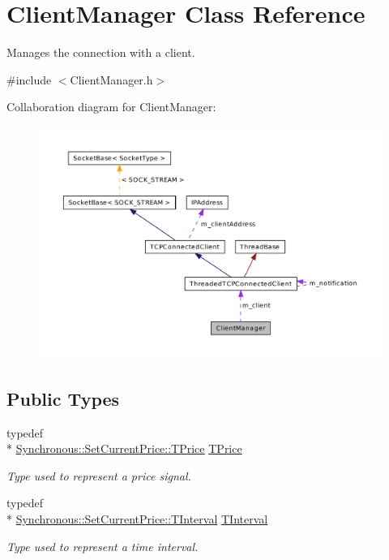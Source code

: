 \hypertarget{class_client_manager}{\section{Client\-Manager Class Reference}
\label{class_client_manager}
}


Manages the connection with a client.  




{\ttfamily \#include $<$Client\-Manager.\-h$>$}



Collaboration diagram for Client\-Manager\-:\nopagebreak
\begin{figure}[H]
\begin{center}
\leavevmode
\includegraphics[width=350pt]{class_client_manager__coll__graph}
\end{center}
\end{figure}
\subsection*{Public Types}
\begin{DoxyCompactItemize}
\item 
typedef \\*
\hyperlink{class_terra_swarm_1_1_synchronous_1_1_set_current_price_a2ed14f2a90070d19a70183bb63e7708e}{Synchronous\-::\-Set\-Current\-Price\-::\-T\-Price} \hyperlink{class_client_manager_ae957a71b432eb6d9d39b0f397cd89874}{T\-Price}
\begin{DoxyCompactList}\small\item\em Type used to represent a price signal. \end{DoxyCompactList}\item 
typedef \\*
\hyperlink{class_terra_swarm_1_1_synchronous_1_1_set_current_price_aa87902078a0788d13ef70b899d83f4d3}{Synchronous\-::\-Set\-Current\-Price\-::\-T\-Interval} \hyperlink{class_client_manager_a429cc3229a8121c83655945ebaec18a6}{T\-Interval}
\begin{DoxyCompactList}\small\item\em Type used to represent a time interval. \end{DoxyCompactList}\end{DoxyCompactItemize}
